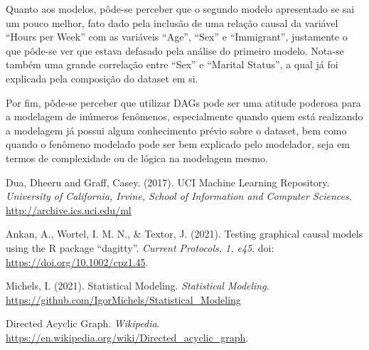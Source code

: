 \documentclass[11pt,letterpaper,twocolumn]{article}
\begin{document}
Quanto aos modelos, pôde-se perceber que o segundo modelo apresentado se sai um pouco melhor, fato dado pela inclusão de uma relação causal da variável ``Hours per Week'' com as variáveis ``Age'', ``Sex'' e ``Immigrant'', justamente o que pôde-se ver que estava defasado pela análise do primeiro modelo. Nota-se também uma grande correlação entre ``Sex'' e ``Marital Status'', a qual já foi explicada pela composição do dataset em si.

Por fim, pôde-se perceber que utilizar DAGs pode ser uma atitude poderosa para a modelagem de inúmeros fenômenos, especialmente quando quem está realizando a modelagem já possui algum conhecimento prévio sobre o dataset, bem como quando o fenômeno modelado pode ser bem explicado pelo modelador, seja em termos de complexidade ou de lógica na modelagem mesmo.

\newpage
\begin{thebibliography}{9}

 Dua, Dheeru and Graff, Casey. (2017). {UCI} Machine Learning Repository. \textit{University of California, Irvine, School of Information and Computer Sciences}. \url{http://archive.ics.uci.edu/ml}

 Ankan, A., Wortel, I. M. N., \& Textor, J. (2021). Testing graphical causal models using the R package ``dagitty''. \textit{Current Protocols, 1, e45}. doi: \url{https://doi.org/10.1002/cpz1.45}.

 Michels, I. (2021). Statistical Modeling. \textit{Statistical Modeling}. \url{https://github.com/IgorMichels/Statistical_Modeling}

 Directed Acyclic Graph. \textit{Wikipedia}. \url{https://en.wikipedia.org/wiki/Directed_acyclic_graph}.

\end{thebibliography}
\end{document}
